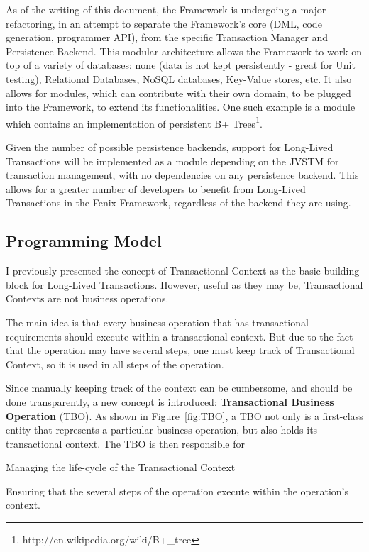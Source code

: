 \documentclass{llncs}
\begin{document}
As of the writing of this document, the Framework is undergoing a
major refactoring, in an attempt to separate the Framework's core
(DML, code generation, programmer API), from the specific Transaction
Manager and Persistence Backend. This modular architecture allows the
Framework to work on top of a variety of databases: none (data is not
kept persistently - great for Unit testing), Relational Databases,
NoSQL databases, Key-Value stores, etc. It also allows for modules,
which can contribute with their own domain, to be plugged into the
Framework, to extend its functionalities. One such example is a module
which contains an implementation of persistent B+
Trees\footnote{http://en.wikipedia.org/wiki/B+\_tree}.

Given the number of possible persistence backends, support for
Long-Lived Transactions will be implemented as a module depending on
the JVSTM for transaction management, with no dependencies on any
persistence backend. This allows for a greater number of developers to
benefit from Long-Lived Transactions in the Fenix Framework,
regardless of the backend they are using.

\subsection{Programming Model}

I previously presented the concept of Transactional Context as the
basic building block for Long-Lived Transactions. However, useful as
they may be, Transactional Contexts are not business operations.

The main idea is that every business operation that has transactional
requirements should execute within a transactional context. But due to
the fact that the operation may have several steps, one must keep
track of Transactional Context, so it is used in all steps of the
operation.

Since manually keeping track of the context can be cumbersome, and
should be done transparently, a new concept is introduced: {\bf
  Transactional Business Operation} (TBO). As shown in
Figure~\ref{fig:TBO}, a TBO not only is a first-class entity that
represents a particular business operation, but also holds its
transactional context. The TBO is then responsible for
\begin{inparaenum}[\itshape 1\upshape)]
\item Managing the life-cycle of the Transactional Context
\item Ensuring that the several steps of the operation execute within
  the operation's context.
\end{inparaenum}
\end{document}
